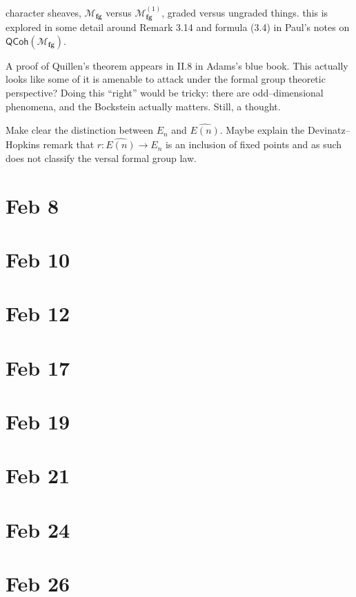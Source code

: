 \documentclass{article}
\newcommand{\<}{\langle}
\renewcommand{\>}{\rangle}
\newcommand{\CatOf}[1]{\mathsf{#1}}
\newcommand{\moduli}[1]{\mathcal{M}_{\mathbf{#1}}}
\numberwithin{equation}{section}
\theoremstyle{plain}
\theoremstyle{definition}
\theoremstyle{remark}
\begin{document}
character sheaves, $\moduli{fg}$ versus $\moduli{fg}^{(1)}$, graded versus ungraded things. this is explored in some detail around Remark 3.14 and formula (3.4) in Paul's notes on $\CatOf{QCoh}(\moduli{fg})$.

A proof of Quillen's theorem appears in II.8 in Adams's blue book. This actually looks like some of it is amenable to attack under the formal group theoretic perspective? Doing this ``right'' would be tricky: there are odd--dimensional phenomena, and the Bockstein actually matters. Still, a thought.

Make clear the distinction between $E_n$ and $\widehat{E(n)}$. Maybe explain the Devinatz--Hopkins remark that $r: \widehat{E(n)} \to E_n$ is an inclusion of fixed points and as such does not classify the versal formal group law.





\section*{Feb 8}

\section*{Feb 10}

\section*{Feb 12}

\section*{Feb 17}

\section*{Feb 19}

\section*{Feb 21}

\section*{Feb 24}

\section*{Feb 26}
\end{document}
